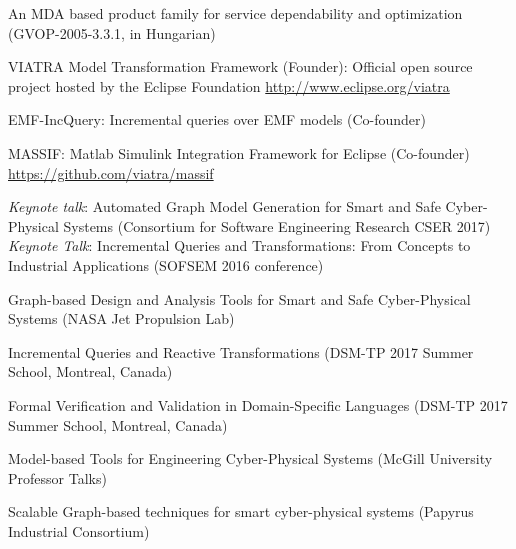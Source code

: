 \documentclass{xetexCV}
\begin{document}

An MDA based product family for service dependability and
optimization (GVOP-2005-3.3.1, in Hungarian)  




VIATRA  Model Transformation Framework (Founder): Official open source project hosted by the Eclipse Foundation \newline
\url{http://www.eclipse.org/viatra} 

EMF-IncQuery:  Incremental queries over EMF models (Co-founder) 

MASSIF:  Matlab Simulink Integration Framework for Eclipse (Co-founder) \newline 
\url{https://github.com/viatra/massif} 



\emph{Keynote talk}: Automated  Graph Model Generation for Smart and Safe Cyber-Physical Systems (Consortium for Software Engineering Research CSER 2017) \\

\emph{Keynote Talk}:  Incremental Queries and Transformations: From Concepts to Industrial Applications  (SOFSEM 2016 conference) 

Graph-based  Design and Analysis Tools for Smart and Safe Cyber-Physical Systems (NASA Jet Propulsion Lab) 

Incremental Queries and Reactive Transformations (DSM-TP 2017 Summer School, Montreal, Canada)

Formal Verification and Validation in Domain-Specific Languages (DSM-TP 2017 Summer School, Montreal, Canada)
	
Model-based Tools for Engineering Cyber-Physical Systems (McGill University Professor Talks)

Scalable  Graph-based techniques for smart cyber-physical systems (Papyrus Industrial Consortium)
\end{document}
